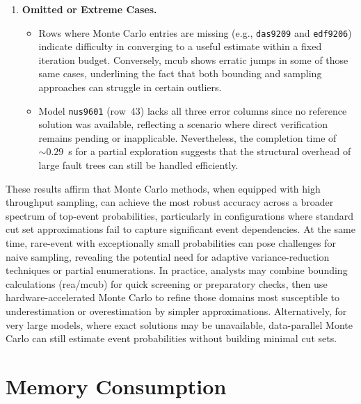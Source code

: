 \begin{enumerate}
    \item \textbf{Omitted or Extreme Cases.}
    \begin{itemize}
        \item Rows where Monte Carlo entries are missing (e.g., \texttt{das9209} and \texttt{edf9206}) indicate difficulty in converging to a useful estimate within a fixed iteration budget. Conversely, \acrshort{mcub} shows erratic jumps in some of those same cases, underlining the fact that both bounding and sampling approaches can struggle in certain outliers.
        \item Model \texttt{nus9601} (row~43) lacks all three error columns since no reference solution was available, reflecting a scenario where direct verification remains pending or inapplicable. Nevertheless, the completion time of \(\sim 0.29\)~s for a partial exploration suggests that the structural overhead of large fault trees can still be handled efficiently.
    \end{itemize}
\end{enumerate}

These results affirm that Monte Carlo methods, when equipped with high throughput sampling, can achieve the most robust accuracy across a broader spectrum of top-event probabilities, particularly in configurations where standard cut set approximations fail to capture significant event dependencies. At the same time, rare-event with exceptionally small probabilities can pose challenges for naive sampling, revealing the potential need for adaptive variance-reduction techniques or partial enumerations. In practice, analysts may combine bounding calculations (\acrshort{rea}/\acrshort{mcub}) for quick screening or preparatory checks, then use hardware-accelerated Monte Carlo to refine those domains most susceptible to underestimation or overestimation by simpler approximations. Alternatively, for very large models, where exact solutions may be unavailable, data-parallel Monte Carlo can still estimate event probabilities without building minimal cut sets. 



\section{Memory Consumption}

